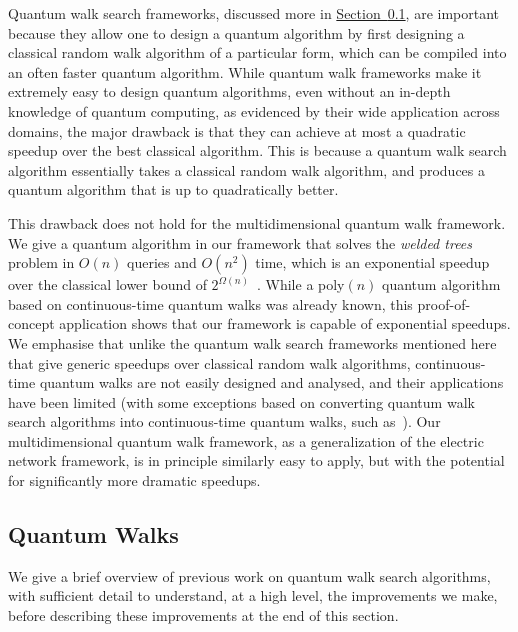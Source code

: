 \documentclass{article}
\renewcommand{\sec}[1]{\hyperref[sec:#1]{Section~\ref*{sec:#1}}}
\renewcommand{\>}{\rangle}
\newcommand{\<}{\langle}
\renewcommand{\(}{\left(}
\renewcommand{\)}{\right)}
\begin{document}
Quantum walk search frameworks, discussed more in \sec{intro-QW}, are important because they allow one to design a quantum algorithm by first designing a classical random walk algorithm of a particular form, which can be compiled into an often faster quantum algorithm.  
While quantum walk frameworks make it extremely easy to design quantum algorithms, even without an in-depth knowledge of quantum computing, as evidenced by their wide application across domains, the major drawback is that they can achieve at most a quadratic speedup over the best classical algorithm. This is because a quantum walk search algorithm essentially takes a classical random walk algorithm, and produces a quantum algorithm that is up to quadratically better. 

This drawback does not hold for the multidimensional quantum walk framework. We give a quantum algorithm in our framework that solves the \emph{welded trees} problem in $O(n)$ queries and $O(n^2)$ time, which is an exponential speedup over the classical lower bound of $2^{\Omega(n)}$~\cite{childs2003ExpSpeedupQW}. While a poly$(n)$ quantum algorithm based on continuous-time quantum walks was already known, this proof-of-concept application shows that our framework is capable of exponential speedups. We emphasise that unlike the quantum walk search frameworks mentioned here that give generic speedups over classical random walk algorithms, continuous-time quantum walks are not easily designed and analysed, and their applications have been limited (with some exceptions based on converting quantum walk search algorithms into continuous-time quantum walks, such as~\cite{apers2022quadratic}). Our multidimensional quantum walk framework, as a generalization of the electric network framework, is in principle similarly easy to apply, but with the potential for significantly more dramatic speedups. 




\subsection{Quantum Walks}\label{sec:intro-QW}

We give a brief overview of previous work on quantum walk search algorithms, with sufficient detail to understand, at a high level, the improvements we make, before describing these improvements at the end of this section.
\end{document}
